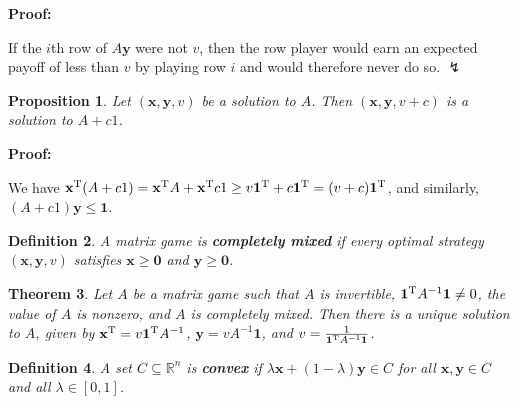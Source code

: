 \documentclass{article}
\theoremstyle{colontheorem}
\newtheorem{theorem}{Theorem}[section]
\newtheorem{proposition}[theorem]{Proposition}
\newtheorem{definition}[theorem]{Definition}
\newcommand{\T}{^\textnormal{T}}
\newenvironment{Theorem}
{
	\begin{mdframed}[backgroundcolor=TheoremOrange!10]
	\begin{theorem}
}
{
	\end{theorem}
	\end{mdframed}
	
	\vspace{.15in}
}
\newenvironment{Proposition}
{
	\begin{mdframed}[backgroundcolor=TheoremOrange!10]
	\begin{proposition}
}
{
	\end{proposition}
	\end{mdframed}
	
	\vspace{.15in}
}
\newenvironment{Def}
{
	\begin{mdframed}[backgroundcolor=DefGreen!10]
	\begin{definition}
}
{
	\end{definition}
	\end{mdframed}
	
	\vspace{.15in}
}
\newenvironment{Proof}
{
	\vspace{-.3in}
	
	\begin{mdframed}[backgroundcolor=ProofPurple!10]
	\textbf{Proof:}%
}
{
	\end{mdframed}
	
	\vspace{.15in}
}
\begin{document}
\begin{Proof}
	If the $i$th row of $A\mathbf{y}$ were not $v$, then the row player would earn an expected payoff of less than $v$ by playing row $i$ and would therefore never do so. $\lightning$
	
\end{Proof}



\begin{Proposition}
	
	Let $(\mathbf{x}, \mathbf{y}, v)$ be a solution to $A$. Then $(\mathbf{x}, \mathbf{y}, v + c)$ is a solution to $A + c1$.
	
\end{Proposition}



\begin{Proof}
	We have $\mathbf{x}\T (A + c1) = \mathbf{x}\T A + \mathbf{x}\T c 1 \geq v \mathbf{1}\T + c \mathbf{1}\T = (v + c) \mathbf{1}\T$, and similarly, $(A + c1) \mathbf{y} \leq \mathbf{1}$.
	
\end{Proof}



\begin{Def}
	
	A matrix game is \textbf{completely mixed} if every optimal strategy $(\mathbf{x}, \mathbf{y}, v)$ satisfies $\mathbf{x} \geq \mathbf{0}$ and $\mathbf{y} \geq \mathbf{0}$.
	
\end{Def}



\begin{Theorem}
	
	Let $A$ be a matrix game such that $A$ is invertible, $\mathbf{1}\T A^{-1} \mathbf{1} \neq 0$, the value of $A$ is nonzero, and $A$ is completely mixed. Then there is a unique solution to $A$, given by $\mathbf{x}\T = v \mathbf{1}\T A^{-1}$, $\mathbf{y} = v A^{-1} \mathbf{1}$, and $v = \frac{1}{\mathbf{1}\T A^{-1} \mathbf{1}}$.
	
\end{Theorem}



\begin{Def}
	
	A set $C \subseteq \mathbb{R}^n$ is \textbf{convex} if $\lambda \mathbf{x} + (1 - \lambda) \mathbf{y} \in C$ for all $\mathbf{x}, \mathbf{y} \in C$ and all $\lambda \in [0, 1]$.
	
\end{Def}
\end{document}
